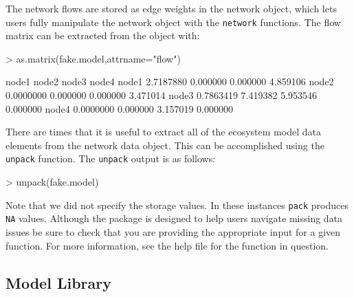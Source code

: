 \documentclass[article]{jss}
\begin{document}
The network flows are stored as edge weights in the network object,
which lets users fully manipulate the network object with the
\texttt{network} functions.  The flow matrix can be extracted from the
object with:

\begin{Schunk}
\begin{Sinput}
> as.matrix(fake.model,attrname="flow")
\end{Sinput}
\begin{Soutput}
          node1    node2    node3    node4
node1 2.7187880 0.000000 0.000000 4.859106
node2 0.0000000 0.000000 0.000000 3.471014
node3 0.7863419 7.419382 5.953546 0.000000
node4 0.0000000 0.000000 3.157019 0.000000
\end{Soutput}
\end{Schunk}

There are times that it is useful to extract all of the ecosystem
model data elements from the network data object.  This can be
accomplished using the \texttt{unpack} function. The \texttt{unpack}
output is as follows:

\begin{Schunk}
\begin{Sinput}
> unpack(fake.model)
\end{Sinput}
\end{Schunk}

Note that we did not specify the storage values. In these instances
\texttt{pack} produces \texttt{NA} values. Although the package is
designed to help users navigate missing data issues be sure to check
that you are providing the appropriate input for a given function. For
more information, see the help file for the function in question.


\subsection{Model Library}
\end{document}
